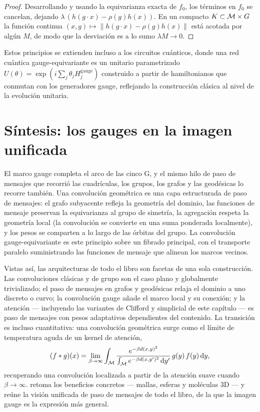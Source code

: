 \begin{proof}
Desarrollando y usando la equivarianza exacta de $f_0$, los t\'erminos en $f_0$ se
cancelan, dejando $\lambda\,(h(g\cdot x) - \rho(g) h(x))$. En un compacto
$K \subset \mathcal{M} \times G$ la funci\'on continua $(x, g) \mapsto \|h(g\cdot x) -
\rho(g) h(x)\|$ est\'a acotada por alg\'un $M$, de modo que la desviaci\'on es a
lo sumo $\lambda M \to 0$.
\end{proof}

Estos principios se extienden incluso a los circuitos cu\'anticos, donde una red
cu\'antica gauge-equivariante es un unitario parametrizado $U(\theta) =
\exp(i\sum_j \theta_j H_j^{\text{gauge}})$ construido a partir de hamiltonianos
que conmutan con los generadores gauge, reflejando la construcci\'on cl\'asica al
nivel de la evoluci\'on unitaria.

\section{S\'intesis: los gauges en la imagen unificada}
\label{sec:gauge:synthesis}

El marco gauge completa el arco de las cinco G, y el mismo hilo de paso de
mensajes que recorri\'o las cuadr\'iculas, los grupos, los grafos y las
geod\'esicas lo recorre tambi\'en. Una convoluci\'on geom\'etrica es una capa
estructurada de paso de mensajes: el grafo subyacente refleja la geometr\'ia del
dominio, las funciones de mensaje preservan la equivarianza al grupo de
simetr\'ia, la agregaci\'on respeta la geometr\'ia local (la convoluci\'on se
convierte en una suma ponderada localmente), y los pesos se comparten a lo largo
de las \'orbitas del grupo. La convoluci\'on gauge-equivariante es este principio
sobre un fibrado principal, con el transporte paralelo suministrando las funciones
de mensaje que alinean los marcos vecinos.

Vistas as\'i, las arquitecturas de todo el libro son facetas de una sola
construcci\'on. Las convoluciones cl\'asicas y de grupo son el caso plano y
globalmente trivializado; el paso de mensajes en grafos y geod\'esicas relaja el
dominio a uno discreto o curvo; la convoluci\'on gauge a\~nade el marco local y su
conexi\'on; y la atenci\'on --- incluyendo las variantes de Clifford y simplicial
de este cap\'itulo --- es paso de mensajes con pesos adaptativos dependientes del
contenido. La transici\'on es incluso cuantitativa: una convoluci\'on
geom\'etrica surge como el l\'imite de temperatura aguda de un kernel de
atenci\'on,
\[
  (f * g)(x) = \lim_{\beta \to \infty} \int_{\mathcal{M}}
  \frac{e^{-\beta d(x, y)^2}}{\int_{\mathcal{M}} e^{-\beta d(x, y')^2}\, \mathrm{d}y'}\,
  g(y)\, f(y)\, \mathrm{d}y,
\]
recuperando una convoluci\'on localizada a partir de la atenci\'on suave cuando
$\beta \to \infty$.  retoma los beneficios concretos ---
mallas, esferas y mol\'eculas $3$D --- y  re\'une la visi\'on
unificada de paso de mensajes de todo el libro, de la que la imagen gauge es la
expresi\'on m\'as general.
